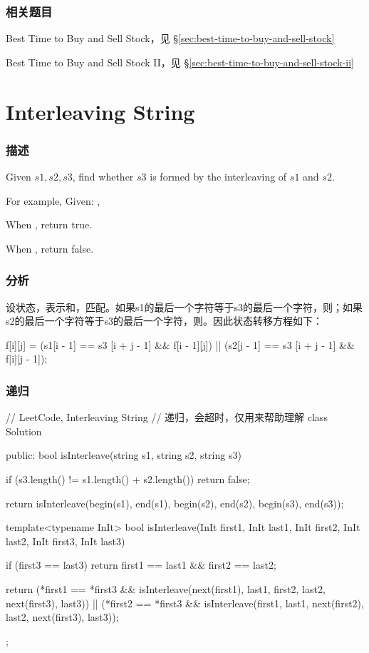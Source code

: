 \subsubsection{相关题目}
\begindot
\item Best Time to Buy and Sell Stock，见 \S \ref{sec:best-time-to-buy-and-sell-stock}
\item Best Time to Buy and Sell Stock II，见 \S \ref{sec:best-time-to-buy-and-sell-stock-ii}
\myenddot


\section{Interleaving String} %
\label{sec:interleaving-string}


\subsubsection{描述}
Given $s1, s2, s3$, find whether $s3$ is formed by the interleaving of $s1$ and $s2$.

For example, Given: ,

When , return true.

When , return false.


\subsubsection{分析}
设状态，表示和，匹配。如果s1的最后一个字符等于s3的最后一个字符，则；如果s2的最后一个字符等于s3的最后一个字符，则。因此状态转移方程如下：
\begin{Code}
f[i][j] = (s1[i - 1] == s3 [i + j - 1] && f[i - 1][j])
       || (s2[j - 1] == s3 [i + j - 1] && f[i][j - 1]);
\end{Code}


\subsubsection{递归}
\begin{Code}
// LeetCode, Interleaving String
// 递归，会超时，仅用来帮助理解
class Solution {
public:
    bool isInterleave(string s1, string s2, string s3) {
        if (s3.length() != s1.length() + s2.length())
            return false;

        return isInterleave(begin(s1), end(s1), begin(s2), end(s2),
                begin(s3), end(s3));
    }

    template<typename InIt>
    bool isInterleave(InIt first1, InIt last1, InIt first2, InIt last2,
            InIt first3, InIt last3) {
        if (first3 == last3)
            return first1 == last1 && first2 == last2;

        return (*first1 == *first3
                && isInterleave(next(first1), last1, first2, last2,
                        next(first3), last3))
                || (*first2 == *first3
                        && isInterleave(first1, last1, next(first2), last2,
                                next(first3), last3));
    }
};
\end{Code}


